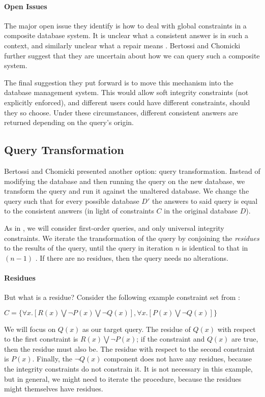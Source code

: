 \documentclass[a4paper]{report}
\begin{document}
\paragraph{Open Issues}

The major open issue they identify is how to deal with global constraints in a composite database system. It is unclear what a consistent answer is in such a context, and similarly unclear what a repair means \cite{CQ}. Bertossi and Chomicki further suggest that they are uncertain about how we can query such a composite system.

The final suggestion they put forward is to move this mechanism into the database management system. This would allow soft integrity constraints (not explicitly enforced), and different users could have different constraints, should they so choose. Under these circumstances, different consistent answers are returned depending on the query's origin.

\subsection*{Query Transformation}

Bertossi and Chomicki presented another option: query transformation. Instead of modifying the database and then running the query on the new database, we transform the query and run it against the unaltered database. We change the query such that for every possible database $D'$ the answers to said query is equal to the consistent answers (in light of constraints $C$ in the original database $D$).

As in \cite{CQ}, we will consider first-order queries, and only universal integrity constraints. We iterate the transformation of the query by conjoining the \textit{residues} to the results of the query, until the query in iteration $n$ is identical to that in $(n-1)$ \cite{CQ}. If there are no residues, then the query needs no alterations.

\paragraph{Residues}
But what is a residue? Consider the following example constraint set from \cite{CQ}:
\begin{center}
$C = \{\forall x.[R(x) \bigvee \neg P(x) \bigvee \neg Q(x)], \forall x.[P(x) \bigvee \neg Q(x)] \}$ 
\end{center}

We will focus on $Q(x)$ as our target query. The residue of $Q(x)$ with respect to the first constraint is $R(x) \bigvee \neg P(x)$; if the constraint and $Q(x)$ are true, then the residue must also be. The residue with respect to the second constraint is $P(x)$. Finally, the $\neg Q(x)$ component does not have any residues, because the integrity constraints do not constrain it. It is not necessary in this example, but in general, we might need to iterate the procedure, because the residues might themselves have residues.
\end{document}

